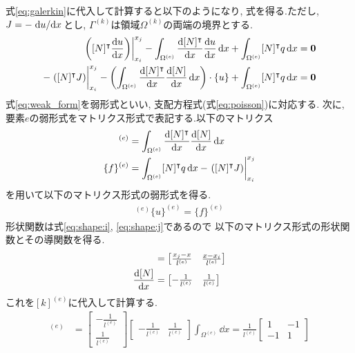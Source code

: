 \documentclass[paper=a4]{jlreq}
\begin{document}
式\eqref{eq:galerkin}に代入して計算すると以下のようになり, 式を得る.ただし, $J=-\dv*{u}{x}$とし, 
$\Gamma^{(k)}$は領域$\Omega^{(k)}$の両端の境界とする.
\begin{align}
    \eval{\qty([N]^\intercal\dv{u}{x})}_{x_i}^{x_j}
    - \int_{\Omega^{(e)}} \dv{[N]^\intercal}{x} \dv{u}{x}\dd{x}
    + \int_{\Omega^{(e)}} [N]^\intercal q\dd{x} & = \vb*{0} \notag               \\
    -\eval{\qty([N]^\intercal J)}_{x_i}^{x_j}
    - \qty(\int_{\Omega^{(e)}} \dv{[N]^\intercal}{x} \dv{[N]}{x}\dd{x})\cdot\{u\}
    + \int_{\Omega^{(e)}} [N]^\intercal q\dd{x} & = \vb*{0} \label{eq:weak_form}
\end{align}
式\eqref{eq:weak_form}を弱形式といい, 支配方程式(式\eqref{eq:poisson})に対応する.
次に, 要素$e$の弱形式をマトリクス形式で表記する.以下のマトリクス
\begin{align}
    [k]^{(e)}   & = \int_{\Omega^{(e)}} \dv{[N]^\intercal}{x} \dv{[N]}{x}\dd{x}  \label{eq:local_matrix}                        \\
    \{f\}^{(e)} & = \int_{\Omega^{(e)}} [N]^\intercal q\dd{x} - \eval{\qty([N]^\intercal J)}_{x_i}^{x_j}\label{eq:local_vector}
\end{align}
を用いて以下のマトリクス形式の弱形式を得る.
\begin{align}
    [k]^{(e)}\{u\}^{(e)} =  \{f\}^{(e)}
    \label{eq:weak_form:mat}
\end{align}
形状関数は式\eqref{eq:shape:i}, \eqref{eq:shape:j}であるので
以下のマトリクス形式の形状関数とその導関数を得る.
\begin{align}
    [N]         & =
    \begin{bmatrix}
        \frac{x_j -x}{l^{(e)}} &
        \frac{x - x_i}{l^{(e)}}
    \end{bmatrix} \\
    \dv{[N]}{x} & =
    \begin{bmatrix}
        -\frac{1}{l^{(e)}} &
        \frac{1}{l^{(e)}}
    \end{bmatrix}
\end{align}
これを$[k]^{(e)}$に代入して計算する.
\begin{align}
    [k]^{(e)} & =
    \begin{bmatrix}
        -\frac{1}{l^{(e)}} \\
        \frac{1}{l^{(e)}}
    \end{bmatrix}
    \begin{bmatrix}
        -\frac{1}{l^{(e)}} &
        \frac{1}{l^{(e)}}
    \end{bmatrix}
    \int_{\Omega^{(e)}}\dd{x}
    = \frac{1}{l^{(e)}}
    \begin{bmatrix}
        1  & -1 \\
        -1 & 1
    \end{bmatrix}
\end{align}
\end{document}
